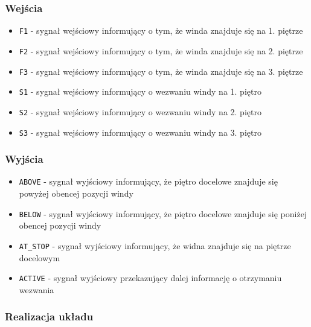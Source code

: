 \documentclass[a4paper]{article}
\begin{document}
\subsubsection{Wejścia}
\begin{itemize}
    \item \verb|F1| - sygnał wejściowy informujący o tym, że winda znajduje się na 1. piętrze
    \item \verb|F2| - sygnał wejściowy informujący o tym, że winda znajduje się na 2. piętrze
    \item \verb|F3| - sygnał wejściowy informujący o tym, że winda znajduje się na 3. piętrze
    \item \verb|S1| - sygnał wejściowy informujący o wezwaniu windy na 1. piętro
    \item \verb|S2| - sygnał wejściowy informujący o wezwaniu windy na 2. piętro
    \item \verb|S3| - sygnał wejściowy informujący o wezwaniu windy na 3. piętro
\end{itemize}

\subsubsection{Wyjścia}
\begin{itemize}
    \item \verb|ABOVE| - sygnał wyjściowy informujący, że piętro docelowe znajduje się powyżej obencej pozycji windy  
    \item \verb|BELOW| - sygnał wyjściowy informujący, że piętro docelowe znajduje się poniżej obencej pozycji windy
    \item \verb|AT_STOP| - sygnał wyjściowy informujący, że widna znajduje się na piętrze docelowym
    \item \verb|ACTIVE| - sygnał wyjściowy przekazujący dalej informację o otrzymaniu wezwania
\end{itemize}

\subsubsection{Realizacja układu}
\end{document}
